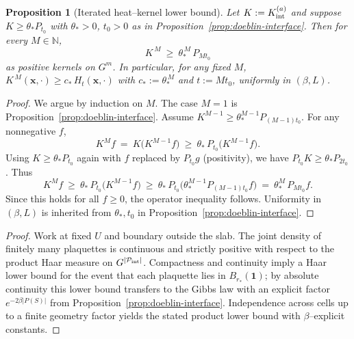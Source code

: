 \documentclass[11pt]{amsart}
\theoremstyle{plain}
\newtheorem{proposition}[theorem]{Proposition}
\theoremstyle{definition}
\theoremstyle{remark}
\begin{document}
\begin{proposition}[Iterated heat--kernel lower bound]\label{prop:iterated-minorization}
Let $K:=K_{\rm int}^{(a)}$ and suppose $K\ge \theta_* P_{t_0}$ with $\theta_*>0$, $t_0>0$ as in Proposition~\ref{prop:doeblin-interface}. Then for every $M\in\mathbb N$,
\[
  K^{\,M}\ \ge\ \theta_*^{\,M}\, P_{M t_0}
\]
as positive kernels on $G^m$. In particular, for any fixed $M$, $K^{\,M}(\mathbf x,\cdot)\ge c_*\, H_{t}(\mathbf x,\cdot)$ with $c_*:=\theta_*^{\,M}$ and $t:=M t_0$, uniformly in $(\beta,L)$.
\end{proposition}
\begin{proof}
We argue by induction on $M$. The case $M=1$ is Proposition~\ref{prop:doeblin-interface}. Assume $K^{M-1}\ge \theta_*^{M-1} P_{(M-1)t_0}$. For any nonnegative $f$,
\[
  K^{M} f\ =\ K\big( K^{M-1} f\big)\ \ge\ \theta_*\, P_{t_0}\big( K^{M-1} f\big).
\]
Using $K\ge \theta_* P_{t_0}$ again with $f$ replaced by $P_{t_0} g$ (positivity), we have $P_{t_0} K\ge \theta_* P_{2 t_0}$. Thus
\[
  K^{M} f\ \ge\ \theta_*\, P_{t_0}\big( K^{M-1} f\big)
   \ \ge\ \theta_*\, P_{t_0}\big( \theta_*^{M-1} P_{(M-1)t_0} f\big)
   \ =\ \theta_*^{M}\, P_{M t_0} f.
\]
Since this holds for all $f\ge 0$, the operator inequality follows. Uniformity in $(\beta,L)$ is inherited from $\theta_*,t_0$ in Proposition~\ref{prop:doeblin-interface}.
\end{proof}
\begin{proof}
Work at fixed $U$ and boundary outside the slab. The joint density of finitely many plaquettes is continuous and strictly positive with respect to the product Haar measure on $G^{|\mathcal P_{\rm int}|}$. Compactness and continuity imply a Haar lower bound for the event that each plaquette lies in $B_{r_*}(\mathbf 1)$; by absolute continuity this lower bound transfers to the Gibbs law with an explicit factor $e^{-2\beta |P(S)|}$ from Proposition~\ref{prop:doeblin-interface}. Independence across cells up to a finite geometry factor yields the stated product lower bound with $\beta$–explicit constants.
\end{proof}
\end{document}

